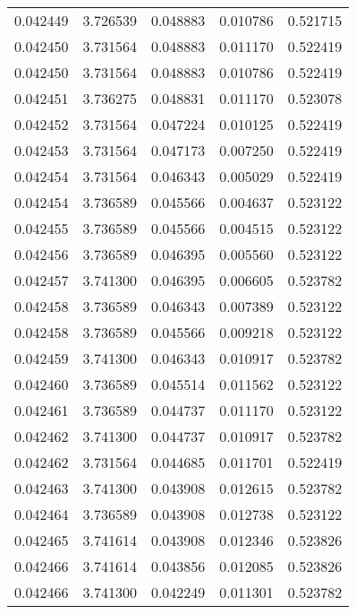 \begin{tabular}{lrrrr}
0.042449    &  3.726539 &  0.048883 &  0.010786 &             0.521715 \\
0.042450    &  3.731564 &  0.048883 &  0.011170 &             0.522419 \\
0.042450    &  3.731564 &  0.048883 &  0.010786 &             0.522419 \\
0.042451    &  3.736275 &  0.048831 &  0.011170 &             0.523078 \\
0.042452    &  3.731564 &  0.047224 &  0.010125 &             0.522419 \\
0.042453    &  3.731564 &  0.047173 &  0.007250 &             0.522419 \\
0.042454    &  3.731564 &  0.046343 &  0.005029 &             0.522419 \\
0.042454    &  3.736589 &  0.045566 &  0.004637 &             0.523122 \\
0.042455    &  3.736589 &  0.045566 &  0.004515 &             0.523122 \\
0.042456    &  3.736589 &  0.046395 &  0.005560 &             0.523122 \\
0.042457    &  3.741300 &  0.046395 &  0.006605 &             0.523782 \\
0.042458    &  3.736589 &  0.046343 &  0.007389 &             0.523122 \\
0.042458    &  3.736589 &  0.045566 &  0.009218 &             0.523122 \\
0.042459    &  3.741300 &  0.046343 &  0.010917 &             0.523782 \\
0.042460    &  3.736589 &  0.045514 &  0.011562 &             0.523122 \\
0.042461    &  3.736589 &  0.044737 &  0.011170 &             0.523122 \\
0.042462    &  3.741300 &  0.044737 &  0.010917 &             0.523782 \\
0.042462    &  3.731564 &  0.044685 &  0.011701 &             0.522419 \\
0.042463    &  3.741300 &  0.043908 &  0.012615 &             0.523782 \\
0.042464    &  3.736589 &  0.043908 &  0.012738 &             0.523122 \\
0.042465    &  3.741614 &  0.043908 &  0.012346 &             0.523826 \\
0.042466    &  3.741614 &  0.043856 &  0.012085 &             0.523826 \\
0.042466    &  3.741300 &  0.042249 &  0.011301 &             0.523782 \\

\end{tabular}
